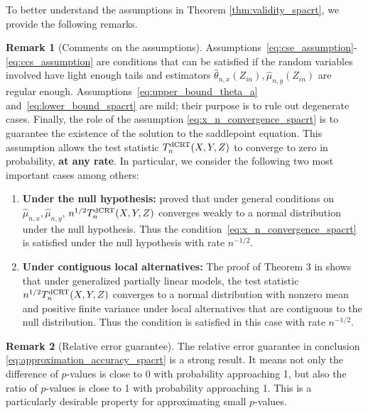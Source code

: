 \documentclass[12pt]{article}
\theoremstyle{definition}
\newtheorem{remark}{Remark}
\newcommand{\srx}{X}									%
\newcommand{\srz}{Z}									%
\newcommand{\sry}{Y}									%
\newcommand{\dCRT}{\textnormal{dCRT}} 					%
\begin{document}
\noindent To better understand the assumptions in Theorem \ref{thm:validity_spacrt}, we provide the following remarks.

\begin{remark}[Comments on the assumptions]
  Assumptions~\eqref{eq:cse_assumption}-\eqref{eq:ccs_assumption} are conditions that can be satisfied if the random variables involved have light enough tails and estimators $\widehat{\theta}_{n,x}(\srz_{in}),\widehat{\mu}_{n,y}(\srz_{in})$ are regular enough. Assumptions~\eqref{eq:upper_bound_theta_a} and~\eqref{eq:lower_bound_spacrt} are mild; their purpose is to rule out degenerate cases. Finally, the role of the assumption \eqref{eq:x_n_convergence_spacrt} is to guarantee the existence of the solution to the saddlepoint equation. This assumption allows the test statistic $T_n^{\dCRT}(\srx,\sry,\srz)$ to converge to zero in probability, \textbf{at any rate}. In particular, we consider the following two most important cases among others:
  \begin{enumerate}
    \item \textbf{Under the null hypothesis:} \citet{Shah2018} proved that under general conditions on $\widehat{\mu}_{n,x},\widehat{\mu}_{n,y}$, $n^{1/2}T_n^{\dCRT}(\srx,\sry,\srz)$ converges weakly to a normal distribution under the null hypothesis. Thus the condition~\eqref{eq:x_n_convergence_spacrt} is satisfied under the null hypothesis with rate $n^{-1/2}$.
    \item \textbf{Under contiguous local alternatives:} The proof of Theorem 3 in \citet{Niu2022a} shows that under generalized partially linear models, the test statistic $n^{1/2}T_n^{\dCRT}(\srx,\sry,\srz)$ converges to a normal distribution with nonzero mean and positive finite variance under local alternatives that are contiguous to the null distribution. Thus the condition is satisfied in this case with rate $n^{-1/2}$.
  \end{enumerate}
\end{remark}

\begin{remark}[Relative error guarantee]
	The relative error guarantee in conclusion \eqref{eq:approximation_accuracy_spacrt} is a strong result. It means not only the difference of $p$-values is close to $0$ with probability approaching 1, but also the ratio of $p$-values is close to 1 with probability approaching 1. This is a particularly desirable property for approximating small $p$-values.
\end{remark}
\end{document}
